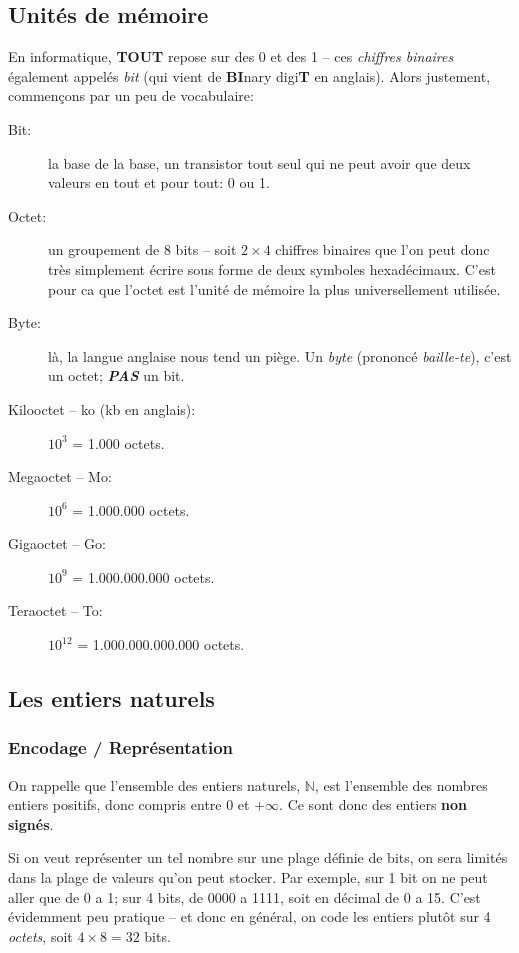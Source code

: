 \documentclass[12pt]{article}
\begin{document}
	 \subsection{Unités de mémoire}
	 En informatique, \textbf{TOUT} repose sur des 0 et des 1 -- ces \emph{chiffres binaires} également appelés \emph{bit} (qui vient de \textbf{BI}nary digi\textbf{T} en anglais). Alors justement, commençons par un peu de vocabulaire:
	 \begin{description}
	 	\item[Bit:] la base de la base, un transistor tout seul qui ne peut avoir que deux valeurs en tout et pour tout: 0 ou 1.
	 	\item[Octet:] un groupement de 8 bits -- soit $2\times4$ chiffres binaires que l'on peut donc très simplement écrire sous forme de deux symboles hexadécimaux. C'est pour ca que l'octet est l'unité de mémoire la plus universellement utilisée.
	 	\item[Byte:] là, la langue anglaise nous tend un piège. Un \emph{byte} (prononcé \emph{baille-te}), c'est un octet; \textbf{\textit{PAS}} un bit.
	 	\item[Kilooctet -- ko (kb en anglais):] $10^3$ = 1.000 octets.
	 	\item[Megaoctet -- Mo:] $10^6$ = 1.000.000 octets.
	 	\item[Gigaoctet -- Go:] $10^9$ = 1.000.000.000 octets.
	 	\item[Teraoctet -- To:] $10^12$ = 1.000.000.000.000 octets.
	 \end{description}
	 
	 \subsection{Les entiers naturels}
	 \subsubsection*{Encodage / Représentation}
	 On rappelle que l'ensemble des entiers naturels, $\mathbb{N}$, est l'ensemble des nombres entiers positifs, donc compris entre 0 et +$\infty$. Ce sont donc des entiers \textbf{non signés}.
	 
	 Si on veut représenter un tel nombre sur une plage définie de bits, on sera limités dans la plage de valeurs qu'on peut stocker. Par exemple, sur 1 bit on ne peut aller que de 0 a 1; sur 4 bits, de 0000 a 1111, soit en décimal de 0 a 15. C'est évidemment peu pratique -- et donc en général, on code les entiers plutôt sur 4 \textit{octets}, soit $4\times8=32$ bits.
	 
\end{document}

